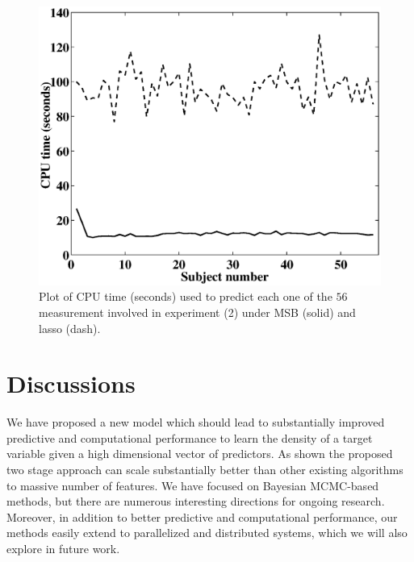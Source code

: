 \documentclass{article}
\begin{document}
\begin{figure}[h!]
\centering
\includegraphics[width=1.0\linewidth]{Time_real2.eps}
\caption{Plot of CPU time (seconds) used to predict each one of the $56$ measurement involved in experiment (2) under MSB (solid) and lasso (dash).} \label{fig:real}
\end{figure}

\section*{Discussions}
We have proposed a new model which should lead to substantially improved predictive and computational performance to learn the density of a target variable given a high dimensional vector of predictors. As shown the proposed two stage approach can scale substantially better than other existing algorithms to massive number of features. We have focused on Bayesian MCMC-based methods, but there are numerous interesting directions for ongoing research. Moreover, in addition to better predictive and computational performance, our methods easily extend to parallelized and distributed systems, which we will also explore in future work.





\end{document}
